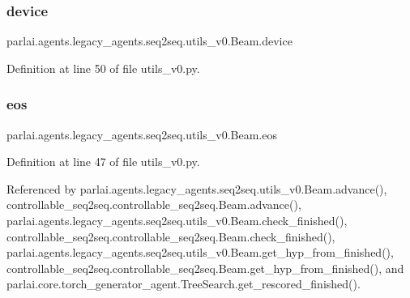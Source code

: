 \subsubsection{\texorpdfstring{device}{device}}
{\footnotesize\ttfamily parlai.\+agents.\+legacy\+\_\+agents.\+seq2seq.\+utils\+\_\+v0.\+Beam.\+device}



Definition at line 50 of file utils\+\_\+v0.\+py.

\mbox{\label{classparlai_1_1agents_1_1legacy__agents_1_1seq2seq_1_1utils__v0_1_1Beam_a821bdac1bbdef3faa186729b7b361da8}} 
\subsubsection{\texorpdfstring{eos}{eos}}
{\footnotesize\ttfamily parlai.\+agents.\+legacy\+\_\+agents.\+seq2seq.\+utils\+\_\+v0.\+Beam.\+eos}



Definition at line 47 of file utils\+\_\+v0.\+py.



Referenced by parlai.\+agents.\+legacy\+\_\+agents.\+seq2seq.\+utils\+\_\+v0.\+Beam.\+advance(), controllable\+\_\+seq2seq.\+controllable\+\_\+seq2seq.\+Beam.\+advance(), parlai.\+agents.\+legacy\+\_\+agents.\+seq2seq.\+utils\+\_\+v0.\+Beam.\+check\+\_\+finished(), controllable\+\_\+seq2seq.\+controllable\+\_\+seq2seq.\+Beam.\+check\+\_\+finished(), parlai.\+agents.\+legacy\+\_\+agents.\+seq2seq.\+utils\+\_\+v0.\+Beam.\+get\+\_\+hyp\+\_\+from\+\_\+finished(), controllable\+\_\+seq2seq.\+controllable\+\_\+seq2seq.\+Beam.\+get\+\_\+hyp\+\_\+from\+\_\+finished(), and parlai.\+core.\+torch\+\_\+generator\+\_\+agent.\+Tree\+Search.\+get\+\_\+rescored\+\_\+finished().

\mbox{\label{classparlai_1_1agents_1_1legacy__agents_1_1seq2seq_1_1utils__v0_1_1Beam_a707079827f1a9da806ebe4f9c8c1a6bb}} 
